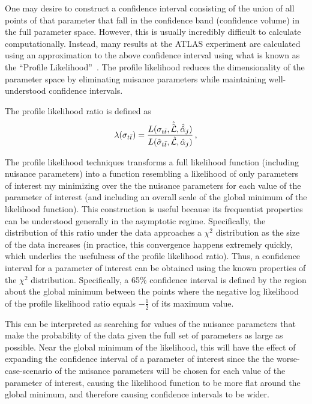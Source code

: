 One may desire to construct a confidence interval consisting of the union of all points of that parameter that fall in the confidence band (confidence volume) in the full parameter space.
However, this is usually incredibly difficult to calculate computationally.
Instead, many results at the ATLAS experiment are calculated using an approximation to the above confidence interval using what is known as the ``Profile Likelihood''~\cite{ATL-CONF-2011-034}.
The profile likelihood reduces the dimensionality of the parameter space by eliminating nuisance parameters while maintaining well-understood confidence intervals.

The profile likelihood ratio is defined as
\begin{equation}
  \lambda(\sigma_{t\bar{t}}) = \frac{L(\sigma_{t\bar{t}}, \hat{\hat{{\cal L}}}, \hat{\hat{\alpha}}_j)}{L(\hat \sigma_{t\bar{t}}, \hat {{\cal L}}, \hat \alpha_j)}\,,
\end{equation}

The profile likelihood techniques transforms a full likelihood function (including nuisance parameters) into a function resembling a likelihood of only parameters of interest my minimizing over the the nuisance parameters for each value of the parameter of interest (and including an overall scale of the global minimum of the likelihood function).
This construction is useful because its frequentist properties can be understood generally in the asymptotic regime.
Specifically, the distribution of this ratio under the data approaches a $\chi^2$ distribution as the size of the data increases (in practice, this convergence happens extremely quickly, which underlies the usefulness of the profile likelihood ratio).
Thus, a confidence interval for a parameter of interest can be obtained using the known properties of the $\chi^2$ distribution.
Specifically, a 65\% confidence interval is defined by the region about the global minimum between the points where the negative log likelihood of the profile likelihood ratio equals $-\frac{1}{2}$ of its maximum value.

This can be interpreted as searching for values of the nuisance parameters that make the probability of the data given the full set of parameters as large as possible.
Near the global minimum of the likelihood, this will have the effect of expanding the confidence interval of a parameter of interest since the the worse-case-scenario of the nuisance parameters will be chosen for each value of the parameter of interest, causing the likelihood function to be more flat around the global minimum, and therefore causing confidence intervals to be wider.

